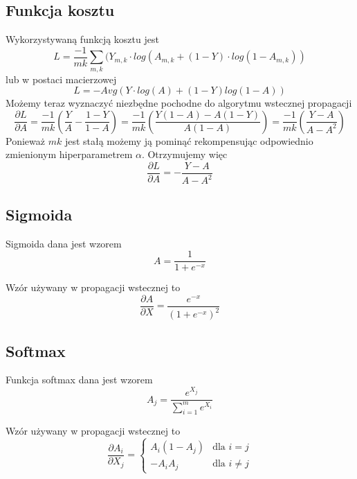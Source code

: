 \documentclass{article}
\begin{document}
\subsection{Funkcja kosztu}
    Wykorzystywaną funkcją kosztu jest
    \[L = \frac{-1}{mk}\sum_{m,k}(Y_{m,k} \cdot log(A_{m,k} + (1 - Y) \cdot log(1 - A_{m,k})) \]
    lub w postaci macierzowej
    \[ L = -Avg(Y \cdot log(A) + (1 - Y) log(1 - A)) \]
    Możemy teraz wyznaczyć niezbędne pochodne do algorytmu wstecznej propagacji
    \[ \frac{\partial L}{\partial A} = \frac{-1}{mk}\left(\frac{Y}{A} - \frac{1 - Y}{1 - A}\right) =
        \frac{-1}{mk}\left( \frac{Y(1 - A) - A(1 - Y)}{A(1 - A)} \right) = 
        \frac{-1}{mk}\left( \frac{Y - A}{A - A^2} \right)\]
    Ponieważ $mk$ jest stałą możemy ją pominąć rekompensując odpowiednio zmienionym hiperparametrem $\alpha$. Otrzymujemy więc
    \[ \frac{\partial L}{\partial A} = -\frac{Y - A}{A - A^2} \]
\subsection{Sigmoida}
    Sigmoida dana jest wzorem
    \[ A = \frac{1}{1 + e^{-x}} \]
    
    Wzór używany w propagacji wstecznej to
    \[ \frac{\partial A}{\partial X} = \frac{e^{-x}}{(1 + e^{-x})^2} \]
    
\subsection{Softmax}
    Funkcja softmax dana jest wzorem
    \[ A_j = \frac{e^{X_j}}{\sum_{i=1}^m e^{X_i}} \]
    
    Wzór używany w propagacji wstecznej to
    \[ \frac{\partial A_i}{\partial X_j} = 
    \left\{
        \begin{array}{ll}
        A_i(1 - A_j) & \mbox{dla } i = j \\
        -A_iA_j & \mbox{dla } i \neq j
        \end{array}
    \right. \]
\end{document}
